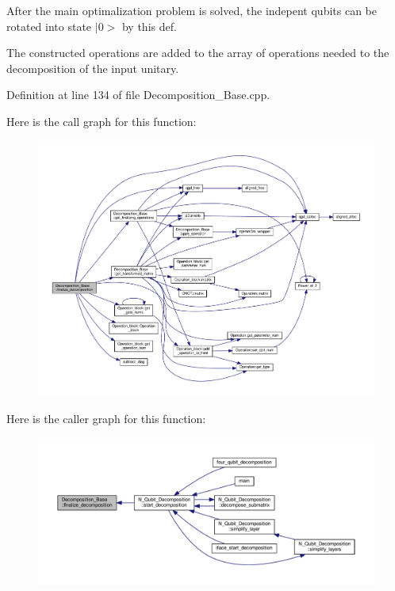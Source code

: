 After the main optimalization problem is solved, the indepent qubits can be rotated into state $\vert$0$>$ by this def. 

The constructed operations are added to the array of operations needed to the decomposition of the input unitary. 

Definition at line 134 of file Decomposition\+\_\+\+Base.\+cpp.



Here is the call graph for this function\+:
\nopagebreak
\begin{figure}[H]
\begin{center}
\leavevmode
\includegraphics[width=350pt]{class_decomposition___base_a0cdd12741e72e2c074a188fe3867e6d5_cgraph}
\end{center}
\end{figure}




Here is the caller graph for this function\+:
\nopagebreak
\begin{figure}[H]
\begin{center}
\leavevmode
\includegraphics[width=350pt]{class_decomposition___base_a0cdd12741e72e2c074a188fe3867e6d5_icgraph}
\end{center}
\end{figure}


